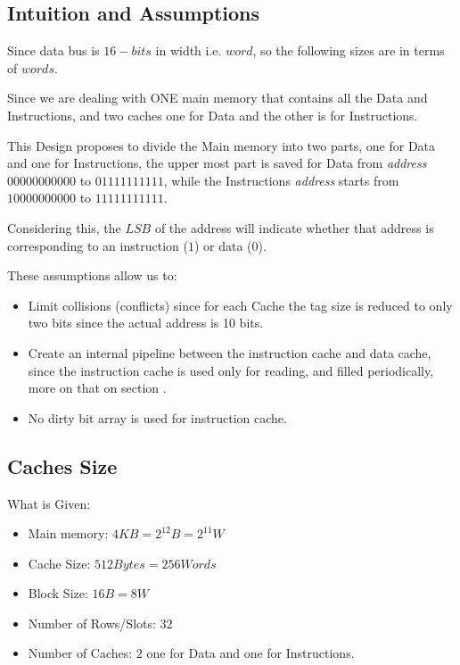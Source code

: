 \subsection{Intuition and Assumptions}
\label{intuitionSection}
    Since data bus is $16-bits$ in width i.e. $word$, so the following sizes are in terms of $words$.
    
    Since we are dealing with ONE main memory that contains all the Data and Instructions,
    and two caches one for Data and the other is for Instructions.

    This Design proposes to divide the Main memory into two parts, one for Data and one for Instructions,
    the upper most part is saved for Data from \textit{address} $00000000000$ to $01111111111$, while the Instructions
    \textit{address} starts from $10000000000$ to $11111111111$.

    Considering this, the $LSB$ of the address will indicate whether that address is corresponding to an instruction ($1$) or data ($0$).

    These assumptions allow us to:
    \begin{itemize}
        \item Limit collisions (conflicts) since for each Cache the tag size is reduced
            to only two bits since the actual address is 10 bits.
        \item Create an internal pipeline between the instruction cache and data cache,
            since the instruction cache is used only for reading, and filled periodically, more on 
            that on section .
        \item No dirty bit array is used for instruction cache.
    \end{itemize}
     
\subsection{Caches Size}
    What is Given:
    \begin{itemize}
        \item Main memory: $4KB = 2^{12}B =2^{11} W$
        \item Cache Size: $512 Bytes = 256Words$
        \item Block Size: $16B = 8W$
        \item Number of Rows/Slots: $32$
        \item Number of Caches: $2$ one for Data and one for Instructions.
    \end{itemize}

